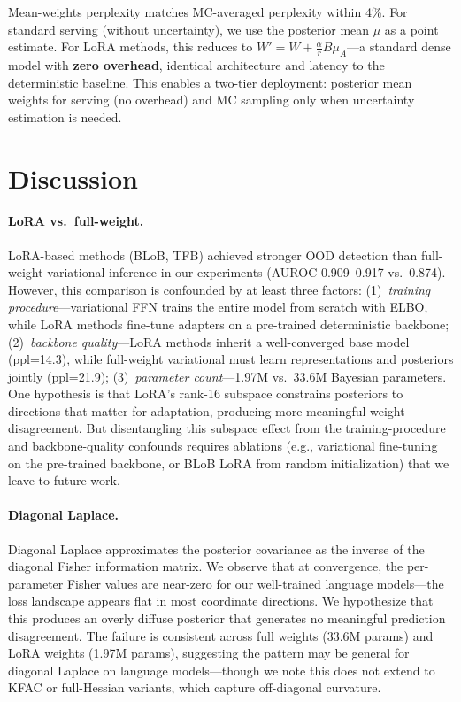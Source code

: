 \documentclass{article}
\begin{document}
Mean-weights perplexity matches MC-averaged perplexity within 4\%. For standard serving (without uncertainty), we use the posterior mean $\mu$ as a point estimate. For LoRA methods, this reduces to $W' = W + \frac{\alpha}{r} B \mu_A$---a standard dense model with \textbf{zero overhead}, identical architecture and latency to the deterministic baseline. This enables a two-tier deployment: posterior mean weights for serving (no overhead) and MC sampling only when uncertainty estimation is needed.

\section{Discussion}
\label{sec:discussion}


\paragraph{LoRA vs.\ full-weight.}
LoRA-based methods (BLoB, TFB) achieved stronger OOD detection than full-weight variational inference in our experiments (AUROC 0.909--0.917 vs.\ 0.874). However, this comparison is confounded by at least three factors: (1)~\textit{training procedure}---variational FFN trains the entire model from scratch with ELBO, while LoRA methods fine-tune adapters on a pre-trained deterministic backbone; (2)~\textit{backbone quality}---LoRA methods inherit a well-converged base model (ppl=14.3), while full-weight variational must learn representations and posteriors jointly (ppl=21.9); (3)~\textit{parameter count}---1.97M vs.\ 33.6M Bayesian parameters. One hypothesis is that LoRA's rank-16 subspace constrains posteriors to directions that matter for adaptation, producing more meaningful weight disagreement. But disentangling this subspace effect from the training-procedure and backbone-quality confounds requires ablations (e.g., variational fine-tuning on the pre-trained backbone, or BLoB LoRA from random initialization) that we leave to future work.

\paragraph{Diagonal Laplace.}
Diagonal Laplace approximates the posterior covariance as the inverse of the diagonal Fisher information matrix. We observe that at convergence, the per-parameter Fisher values are near-zero for our well-trained language models---the loss landscape appears flat in most coordinate directions. We hypothesize that this produces an overly diffuse posterior that generates no meaningful prediction disagreement. The failure is consistent across full weights (33.6M params) and LoRA weights (1.97M params), suggesting the pattern may be general for diagonal Laplace on language models---though we note this does not extend to KFAC or full-Hessian variants, which capture off-diagonal curvature.
\end{document}
